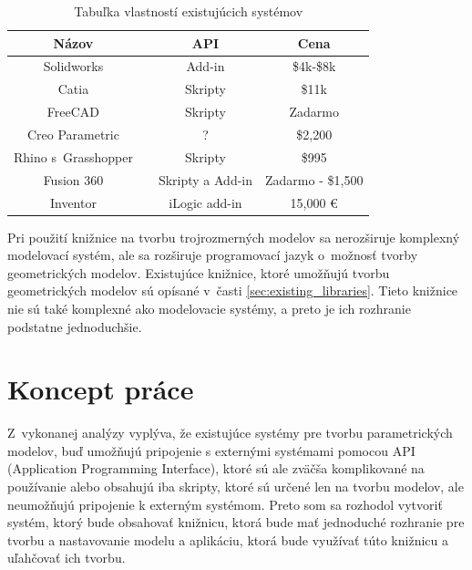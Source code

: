 \begin{table}[H]
\centering
\begin{tabular}{ |c|c|c|c| }
 \hline
 Názov &  & API & Cena \\
 \hline
 \hline
 Solidworks &  & Add-in & \$4k-\$8k \\ 
  \hline
 Catia &  & Skripty & \$11k \\  
  \hline
 FreeCAD &  & Skripty & Zadarmo \\  
  \hline
 Creo Parametric &  & ? &  \$2,200 \\
  \hline
 Rhino s~Grasshopper &   & Skripty & \$995 \\
  \hline
 Fusion 360 & & Skripty a Add-in & Zadarmo - \$1,500 \\
  \hline
 Inventor &  & iLogic add-in & 15,000 \euro  \\
  \hline
\end{tabular}
\caption{Tabuľka vlastností existujúcich systémov}
 \label{tab:systemsAndLibs}
\end{table}




Pri použití knižnice na tvorbu trojrozmerných modelov sa nerozširuje komplexný modelovací systém, ale sa rozširuje programovací jazyk o~možnosť tvorby geometrických modelov. Existujúce knižnice, ktoré umožňujú tvorbu geometrických modelov sú opísané v~časti \ref{sec:existing_libraries}.
Tieto knižnice nie sú také komplexné ako modelovacie systémy, a preto je ich rozhranie podstatne jednoduchšie.







\section{Koncept práce}
Z~vykonanej analýzy vyplýva, že existujúce systémy pre tvorbu parametrických modelov, buď umožňujú pripojenie s externými systémami pomocou API (Application Programming Interface), ktoré sú ale zväčša komplikované na používanie alebo obsahujú iba skripty, ktoré sú určené len na tvorbu modelov, ale neumožňujú pripojenie k externým systémom. Preto som sa rozhodol vytvoriť systém, ktorý bude obsahovať knižnicu, ktorá bude mať jednoduché rozhranie pre tvorbu a nastavovanie modelu a aplikáciu, ktorá bude využívať túto knižnicu a uľahčovať ich tvorbu. 



